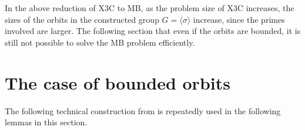 In the above reduction of X3C to MB, as the problem size of X3C increases, the sizes of the orbits in the constructed group $G = \langle \sigma \rangle$ increase, since the primes involved are larger. The following section  that even if the orbits are bounded, it is still not possible to solve the MB problem efficiently.

\section{The case of bounded orbits}

The following technical construction from \cite{blaha1992} is repeatedly used in the following lemmas in this section. 

